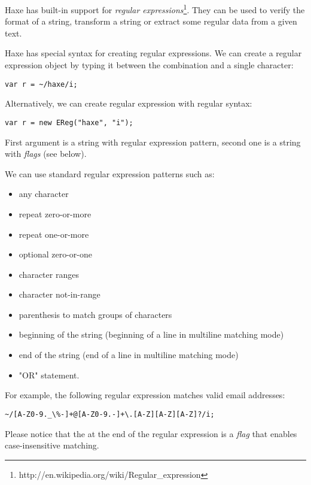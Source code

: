 Haxe has built-in support for \emph{regular expressions}\footnote{http://en.wikipedia.org/wiki/Regular_expression}. They can be used to verify the format of a string, transform a string or extract some regular data from a given text.

Haxe has special syntax for creating regular expressions. We can create a regular expression object by typing it between the \expr{\textasciitilde/} combination and a single \expr{/} character:

\begin{lstlisting}
var r = ~/haxe/i;
\end{lstlisting}

Alternatively, we can create regular expression with regular syntax:

\begin{lstlisting}
var r = new EReg("haxe", "i");
\end{lstlisting}

First argument is a string with regular expression pattern, second one is a string with \emph{flags} (see below).

We can use standard regular expression patterns such as:
\begin{itemize}
	\item {} any character
	\item \expr{*} repeat zero-or-more
	\item \expr{+} repeat one-or-more
	\item {} optional zero-or-one
	\item \expr{[A-Z0-9]} character ranges
	\item {} character not-in-range
	\item {} parenthesis to match groups of characters
	\item \expr{\textasciicircum} beginning of the string (beginning of a line in multiline matching mode)
	\item \expr{\$} end of the string (end of a line in multiline matching mode)
	\item \expr{|} "OR" statement.
\end{itemize}

For example, the following regular expression matches valid email addresses:
\begin{lstlisting}
~/[A-Z0-9._\%-]+@[A-Z0-9.-]+\.[A-Z][A-Z][A-Z]?/i;
\end{lstlisting}

Please notice that the  at the end of the regular expression is a \emph{flag} that enables case-insensitive matching.

